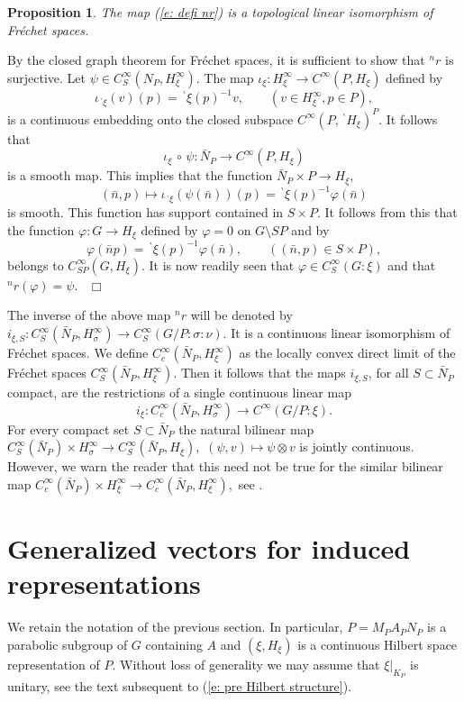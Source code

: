 \documentclass[12pt,a4paper]{article}
\newtheorem{Prop}[Thm]{Proposition}
\newenvironment{prop}[0]{\begin{Prop}\noindent}%
{\end{Prop}}
\def\proof{\par\noindent{\it Proof.}{\ }{\ }}
\def\qed{~\hfill\hbox{$\Box$}\medbreak}
\def\qquad{\quad\quad}
\def\gf{\varphi}
\def\gs{\sigma}
\def\to{\rightarrow}
\def\after{\,{\scriptstyle\circ}\,}
\numberwithin{Thm}{section}
\numberwithin{equation}{section}
\numberwithin{equation}{section}
\def\bp{\!{\,}^\backprime}
\begin{document}
\begin{prop}
The map (\ref{e: defi nr}) is a topological linear isomorphism of Fr\'echet spaces.
\end{prop}

\proof 
By the closed graph theorem for Fr\'echet spaces, it is sufficient to show that
${}^n r$ is surjective. Let $\psi \in C^{\infty}_S(N_P, H_\xi^\infty).$ 
The map $\iota_\xi: H_\xi^\infty \to C^\infty(P, H_\xi)$ defined by 
$$
\iota_{\bp\xi}(v)(p) = \bp\xi(p)^{-1}v , \qquad (v \in H_\xi^\infty, p \in P),
$$ 
is a continuous embedding onto the closed subspace $C^\infty(P, \bp H_\xi)^P.$  It follows that 
$$ 
\iota_\xi \after \psi: \bar N_P \to C^\infty(P, H_\xi)
$$ 
is a smooth map. This implies that the function $\bar N_P \times P \to H_\xi,$ 
$$
(\bar n, p)\mapsto  \iota_{\bp\xi} (\psi(\bar n))(p) = \bp\xi(p)^{-1}\gf(\bar n)
$$
is smooth. This function has support contained in $S \times P.$ 
It follows from this that the function $\gf: G \to H_\xi$ defined by $\gf = 0$ on $G\setminus SP$
and by 
$$ 
\gf(\bar n p) = \bp\xi(p)^{-1}\gf(\bar n), \qquad ((\bar n, p) \in S \times P),
$$ 
belongs to $C^\infty_{SP} (G, H_\xi).$ It is now readily seen that $\gf \in C^\infty_S(G:\xi)$ 
and that ${}^n r(\gf) = \psi.$
\qed

The inverse of the above map ${}^n r$ will be denoted by 
$i_{\xi, S}:  C_S^\infty(\bar N_P, H_\gs^\infty) \to C_S^\infty(G/P : \gs: \nu).$ 
It is a continuous linear isomorphism of Fr\'echet spaces. We define
$C_c^\infty(\bar N_P, H_\xi^\infty)$ as the locally convex direct limit
of the Fr\'echet spaces $C_S^\infty(\bar N_P, H_\xi^\infty).$ 
Then it follows that the maps $i_{\xi, S}$, for all $S\subset \bar N_P$ compact,
are the restrictions of a single continuous linear map 
\begin{equation} 
\label{e: i nu}
i_{\xi}:  C_c^\infty(\bar N_P, H_\gs^\infty) \to C^\infty(G/P : \xi).
\end{equation}  
For every compact set $S \subset \bar N_P$ 
the natural bilinear map $C^\infty_S(\bar N_P ) \times H_\gs^\infty \to C^\infty_S(\bar N_P, H_\xi),$ $(\psi , v)\mapsto \psi\otimes v$ is jointly continuous. However, we warn the reader that 
this need not be true for the similar bilinear map $C_c^\infty(\bar N_P)\times H_\xi^\infty \to C_c^\infty(\bar N_P, H_\xi^\infty),$ see \cite[Cor. 4.18]{Osb}.

\section{Generalized vectors for induced representations}
\label{s: generalized vectors for ind reps}
We retain the notation of the previous section. In particular,
$P= M_P A_P N_P$ is a parabolic subgroup of $G$ containing $A$ and 
$(\xi, H_\xi)$ is a continuous Hilbert space representation of $P.$ 
Without loss of generality we may assume that $\xi|_{K_P}$ is unitary, see
the text subsequent to (\ref{e: pre Hilbert structure}).
\end{document}

